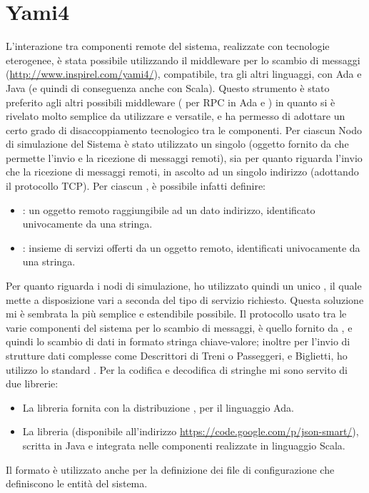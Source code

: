 	\section{Yami4}
L'interazione tra componenti remote del sistema, realizzate con tecnologie eterogenee, è stata possibile utilizzando il middleware per lo scambio di messaggi  (\url{http://www.inspirel.com/yami4/}), compatibile, tra gli altri linguaggi, con Ada e Java (e quindi di conseguenza anche con Scala). Questo strumento è stato preferito agli altri possibili middleware ( per RPC in Ada e ) in quanto si è rivelato molto semplice da utilizzare e versatile, e ha permesso di adottare un certo grado di disaccoppiamento tecnologico tra le componenti. Per ciascun Nodo di simulazione del Sistema è stato utilizzato un singolo  (oggetto fornito da  che permette l'invio e la ricezione di messaggi remoti), sia per quanto riguarda l'invio che la ricezione di messaggi remoti, in ascolto ad un singolo indirizzo (adottando il protocollo TCP). Per ciascun , è possibile infatti definire:
	\begin{itemize}
		\item {}: un oggetto remoto raggiungibile ad un dato indirizzo, identificato univocamente da una stringa.
		\item {}: insieme di servizi offerti da un oggetto remoto, identificati univocamente da una stringa.
	\end{itemize}
Per quanto riguarda i nodi di simulazione, ho utilizzato quindi un unico , il quale mette a disposizione vari  a seconda del tipo di servizio richiesto. Questa soluzione mi è sembrata la più semplice e estendibile possibile.
Il protocollo usato tra le varie componenti del sistema per lo scambio di messaggi, è quello fornito da , e quindi lo scambio di dati in formato stringa chiave-valore; inoltre per l'invio di strutture dati complesse come Descrittori di Treni o Passeggeri, e Biglietti, ho utilizzo lo standard . Per la codifica e decodifica di stringhe  mi sono servito di due librerie:
	\begin{itemize}
		\item La libreria  fornita con la distribuzione , per il linguaggio Ada.
		\item La libreria  (disponibile all'indirizzo \url{https://code.google.com/p/json-smart/}), scritta in Java e integrata nelle componenti realizzate in linguaggio Scala.
		
	\end{itemize}
	Il formato  è utilizzato anche per la definizione dei file di configurazione che definiscono le entità del sistema.



